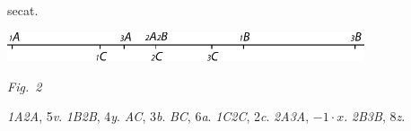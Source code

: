 secat.%
%
%
\pend%
  \vspace{2.5em}%
  \centerline{\includegraphics[width=0.79\textwidth]{gesamttex/edit_VIII,3/images/LH_35_09_21_001-002_d2.pdf}}%
  \vspace{0.5em}
  \centerline{\lbrack\textit{Fig.~2}\rbrack}%
  \label{LH_35_09_21_002r_Fig.2}%
%
\newpage
%
\pstart%
\textit{{\scriptsize1}A{\scriptsize2}A}, 5\textit{v}.\;
\textit{{\scriptsize1}B{\scriptsize2}B}, 4\textit{y}.\;
\textit{AC}, 3\textit{b}.\;
\textit{BC}, 6\textit{a}.\;
\textit{{\scriptsize1}C{\scriptsize2}C}, 2\textit{c}.\;
%
\textit{{\scriptsize2}A{\scriptsize3}A}, $-1\!\cdot\!x.$\;
%
\textit{{\scriptsize2}B{\scriptsize3}B}, 8\textit{z}.
%
%
%
\pend%
%
\pstart%
%
